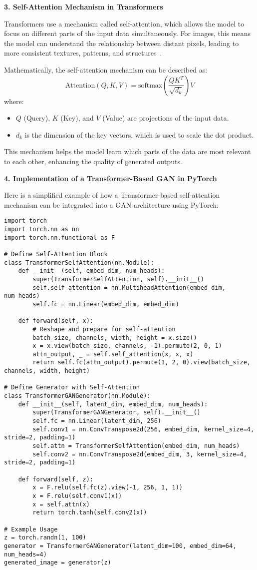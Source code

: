 \textbf{3. Self-Attention Mechanism in Transformers}

Transformers use a mechanism called self-attention, which allows the model to focus on different parts of the input data simultaneously. For images, this means the model can understand the relationship between distant pixels, leading to more consistent textures, patterns, and structures~\cite{mustafa2020transformation}.

Mathematically, the self-attention mechanism can be described as:
\[
\text{Attention}(Q, K, V) = \text{softmax}\left(\frac{QK^T}{\sqrt{d_k}}\right) V
\]
where:
\begin{itemize}
    \item $Q$ (Query), $K$ (Key), and $V$ (Value) are projections of the input data.
    \item $d_k$ is the dimension of the key vectors, which is used to scale the dot product.
\end{itemize}
This mechanism helps the model learn which parts of the data are most relevant to each other, enhancing the quality of generated outputs.

\textbf{4. Implementation of a Transformer-Based GAN in PyTorch}

Here is a simplified example of how a Transformer-based self-attention mechanism can be integrated into a GAN architecture using PyTorch:

\begin{lstlisting}[style=python]
import torch
import torch.nn as nn
import torch.nn.functional as F

# Define Self-Attention Block
class TransformerSelfAttention(nn.Module):
    def __init__(self, embed_dim, num_heads):
        super(TransformerSelfAttention, self).__init__()
        self.self_attention = nn.MultiheadAttention(embed_dim, num_heads)
        self.fc = nn.Linear(embed_dim, embed_dim)
    
    def forward(self, x):
        # Reshape and prepare for self-attention
        batch_size, channels, width, height = x.size()
        x = x.view(batch_size, channels, -1).permute(2, 0, 1)
        attn_output, _ = self.self_attention(x, x, x)
        return self.fc(attn_output).permute(1, 2, 0).view(batch_size, channels, width, height)

# Define Generator with Self-Attention
class TransformerGANGenerator(nn.Module):
    def __init__(self, latent_dim, embed_dim, num_heads):
        super(TransformerGANGenerator, self).__init__()
        self.fc = nn.Linear(latent_dim, 256)
        self.conv1 = nn.ConvTranspose2d(256, embed_dim, kernel_size=4, stride=2, padding=1)
        self.attn = TransformerSelfAttention(embed_dim, num_heads)
        self.conv2 = nn.ConvTranspose2d(embed_dim, 3, kernel_size=4, stride=2, padding=1)
    
    def forward(self, z):
        x = F.relu(self.fc(z).view(-1, 256, 1, 1))
        x = F.relu(self.conv1(x))
        x = self.attn(x)
        return torch.tanh(self.conv2(x))

# Example Usage
z = torch.randn(1, 100)
generator = TransformerGANGenerator(latent_dim=100, embed_dim=64, num_heads=4)
generated_image = generator(z)
\end{lstlisting}

